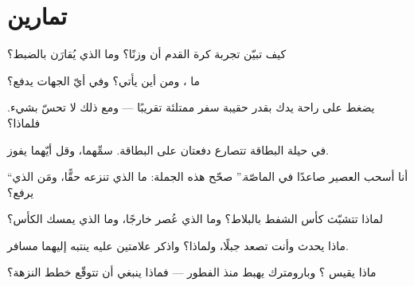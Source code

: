 \section{تمارين}

\begin{exercise}[$\star$]\label{exo:g5:air-pressure-weather:1}
كيف تبيّن تجربة كرة القدم أن  وزنًا؟ وما الذي يُقارَن
بالضبط؟
\end{exercise}

\begin{exercise}[$\star$]\label{exo:g5:air-pressure-weather:2}
ما ، ومن أين يأتي؟ وفي أيّ الجهات يدفع؟
\end{exercise}

\begin{exercise}[$\star$]\label{exo:g5:air-pressure-weather:3}
يضغط  على راحة يدك بقدر  حقيبة سفر ممتلئة تقريبًا
--- ومع ذلك لا تحسّ بشيء. فلماذا؟
\end{exercise}

\begin{exercise}[$\star$]\label{exo:g5:air-pressure-weather:4}
في حيلة البطاقة تتصارع دفعتان على البطاقة. سمِّهما، وقل أيّهما
يفوز.
\end{exercise}

\begin{exercise}[$\star$]\label{exo:g5:air-pressure-weather:5}
``أنا أسحب العصير صاعدًا في الماصّة.'' صحّح هذه الجملة: ما الذي
تنزعه حقًّا، ومَن الذي يرفع؟
\end{exercise}

\begin{exercise}[$\star$]\label{exo:g5:air-pressure-weather:6}
لماذا تتشبّث كأس الشفط بالبلاط؟ وما الذي عُصر خارجًا، وما الذي
يمسك الكأس؟
\end{exercise}

\begin{exercise}[$\star$]\label{exo:g5:air-pressure-weather:7}
ماذا يحدث  وأنت تصعد جبلًا، ولماذا؟ واذكر علامتين
عليه ينتبه إليهما مسافر.
\end{exercise}

\begin{exercise}[$\star$]\label{exo:g5:air-pressure-weather:8}
ماذا يقيس ؟ وبارومترك يهبط  منذ الفطور --- فماذا
ينبغي أن تتوقّع خطط النزهة؟
\end{exercise}

